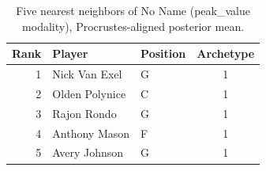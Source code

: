 \begin{table}[htbp]
  \centering\small
  \begin{tabular}{rllc}
    \toprule
    Rank & Player & Position & Archetype \\
    \midrule
    1 & Nick Van Exel & G & 1 \\
    2 & Olden Polynice & C & 1 \\
    3 & Rajon Rondo & G & 1 \\
    4 & Anthony Mason & F & 1 \\
    5 & Avery Johnson & G & 1 \\
    \bottomrule
  \end{tabular}
  \caption{Five nearest neighbors of No Name (peak_value modality), Procrustes-aligned posterior mean.}
  \label{tab:No_Name_neighbors_peak_value}
\end{table}

